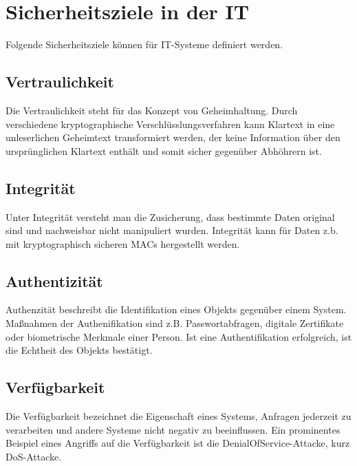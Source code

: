 \documentclass[../main.tex]{subfiles}
\begin{document}

  \section{Sicherheitsziele in der IT}
  \label{introSecGoals}
		Folgende Sicherheitsziele können für \acrshort{IT}-Systeme definiert werden.





    \subsection{Vertraulichkeit}
			Die Vertraulichkeit steht für das Konzept von Geheimhaltung. Durch verschiedene kryptographische Verschlüsslungsverfahren kann Klartext in eine unleserlichen Geheimtext transformiert werden, der keine Information über den ursprünglichen Klartext enthält und somit sicher gegenüber Abhöhrern ist.
    \subsection{Integrität}
			Unter Integrität versteht man die Zusicherung, dass bestimmte Daten original sind und nachweisbar nicht manipuliert wurden. Integrität kann für Daten z.b. mit kryptographisch sicheren MACs hergestellt werden.
		\subsection{Authentizität}
			Authenzität beschreibt die Identifikation eines Objekts gegenüber einem System. Maßnahmen der Authenifikation sind z.B. Passwortabfragen, digitale Zertifikate oder biometrische Merkmale einer Person. Ist eine Authentifikation erfolgreich, ist die Echtheit des Objekts bestätigt.
    \subsection{Verfügbarkeit}
			Die Verfügbarkeit bezeichnet die Eigenschaft eines Systems, Anfragen jederzeit zu verarbeiten und andere Systeme nicht negativ zu beeinflussen. Ein prominentes Beispiel eines Angriffs auf die Verfügbarkeit ist die \gls{DenialOfService}-Attacke, kurz \acrshort{DoS}-Attacke.
\end{document}
